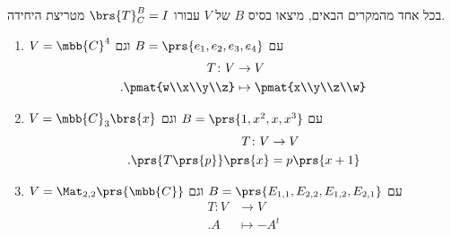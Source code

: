 \documentclass[a4paper,10pt,twoside,openany]{article}
\begin{document}
\begin{exercise}
בכל אחד מהמקרים הבאים, מיצאו בסיס
$B$
של
$V$
עבורו
$\brs{T}^B_C = I$
מטריצת היחידה.

\begin{enumerate}
\item $V = \mbb{C}^4$
עם
$B = \prs{e_1, e_2, e_3, e_4}$
וגם
\begin{align*}
T \colon V &\to V \\
\text{.} \pmat{w\\x\\y\\z} &\mapsto \pmat{x\\y\\z\\w}
\end{align*}

\item $V = \mbb{C}_3\brs{x}$
עם
$B = \prs{1,x^2,x,x^3}$
וגם
\begin{align*}
T \colon V &\to V \\
\text{.} \prs{T\prs{p}}\prs{x} &= p\prs{x+1}
\end{align*}

\item $V = \Mat_{2,2}\prs{\mbb{C}}$
עם
$B = \prs{E_{1,1}, E_{2,2}, E_{1,2}, E_{2,1}}$
וגם
\begin{align*}
T \colon V &\to V \\
\text{.} A &\mapsto -A^t
\end{align*}
\end{enumerate}
\end{exercise}

\pagebreak
\end{document}
